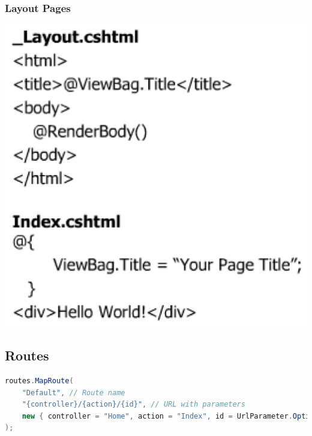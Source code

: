 \documentclass[10pt]{article}
\begin{document}
\subsubsection{Layout Pages}
\begin{center}
	\includegraphics[scale=0.2]{mvc_view_layout.png}
\end{center}
\subsection{Routes}
\begin{lstlisting}[language=Java, caption=routes, style=JavaStyle]
routes.MapRoute(
	"Default", // Route name
	"{controller}/{action}/{id}", // URL with parameters
	new { controller = "Home", action = "Index", id = UrlParameter.Optional } // Default
);
\end{lstlisting}
\end{document}
